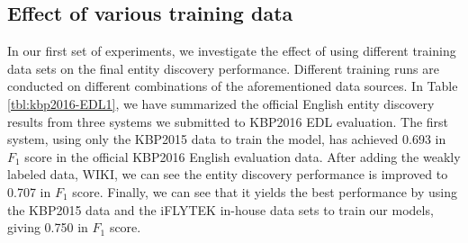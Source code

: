 \documentclass[11pt,a4paper]{article}
\begin{document}


\subsection{Effect of various training data}

In our first set of experiments, we investigate the effect of using different training data sets on the final entity discovery performance. 
Different training runs are conducted on different combinations of the aforementioned data sources.
In Table \ref{tbl:kbp2016-EDL1}, we have summarized the official English entity discovery results from three systems we submitted to KBP2016 EDL evaluation. The first system, using only the KBP2015 data to train the model, has achieved 0.693 in $F_1$ score in the official KBP2016 English evaluation data. After adding the weakly labeled data, WIKI, we can see the entity discovery performance is improved to 0.707 in  $F_1$ score. Finally, we can see that it yields the best performance by using the KBP2015 data and the iFLYTEK in-house data sets to train our models, giving 0.750 in $F_1$ score.
\end{document}
